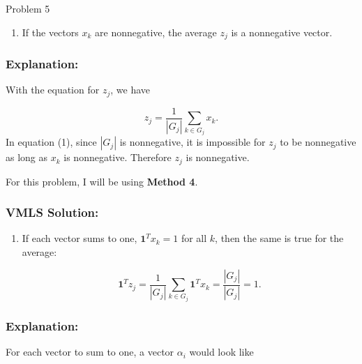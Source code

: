 \begin{problem}{Problem 5}
\begin{Highlight}
        \begin{enumerate}[label = (\alph*), start = 1]
            \item If the vectors $x_{k}$ are nonnegative, the average $z_{j}$ is a nonnegative vector.
        \end{enumerate}

        \subsubsection*{Explanation:}

        With the equation for $z_{j}$, we have 
        
        \setcounter{equation}{0}
        \begin{equation}
            z_{j} = \frac{1}{|G_{j}|} \sum_{k \in G_{j}} x_{k}.
        \end{equation}
        In equation (1), since $|G_{j}|$ is nonnegative, it is impossible for $z_{j}$ to be nonnegative as long as $x_{k}$ is nonnegative. Therefore $z_{j}$ is nonnegative.
    \end{Highlight}

    \begin{Highlight}
        \noindent For this problem, I will be using \textbf{Method 4}. 

        \subsubsection*{VMLS Solution:}

        \begin{enumerate}[label = (\alph*), start = 2]
            \item If each vector sums to one, $\mathbf{1}^{T}x_{k} = 1$ for all $k$, then the same is true for the average:
            
            \begin{equation*}
                \mathbf{1}^{T}z_{j} = \frac{1}{|G_{j}|} \sum_{k \in G_{j}} \mathbf{1}^{T}x_{k} = \frac{|G_{j}|}{|G_{j}|} = 1.
            \end{equation*}
        \end{enumerate}

        \subsubsection*{Explanation:}

        For each vector to sum to one, a vector $\alpha_{i}$ would look like


\end{Highlight}
\end{problem}
